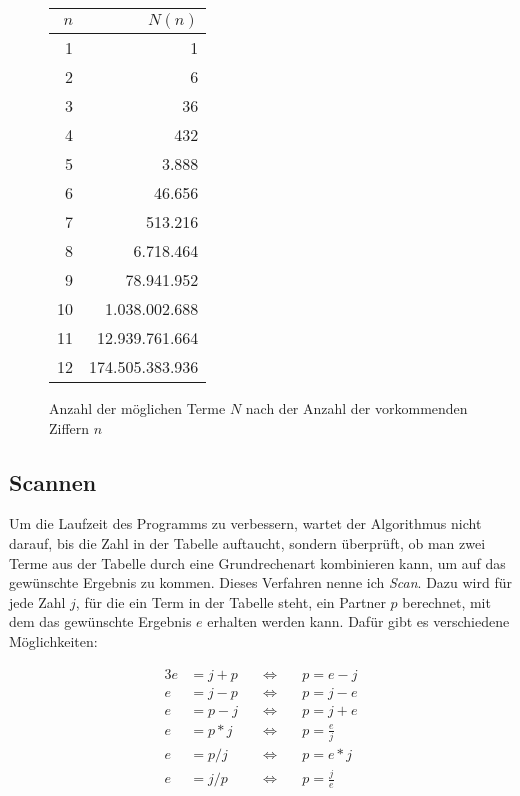 \documentclass[a4paper,10pt,ngerman]{scrartcl}
\begin{document}
\begin{figure}[]
  \centering
  \begin{tabular}{|r|r|}
  $n$ & $N(n)$ \\ \hline
  1 & 1 \\ \hline
  2 & 6 \\ \hline
  3 & 36 \\ \hline
  4 & 432 \\ \hline
  5 & 3.888 \\ \hline
  6 & 46.656 \\ \hline
  7 & 513.216 \\ \hline
  8 & 6.718.464 \\ \hline
  9 & 78.941.952 \\ \hline
  10 & 1.038.002.688 \\ \hline
  11 & 12.939.761.664 \\ \hline
  12 & 174.505.383.936 \\ 
  \end{tabular}
  \caption{Anzahl der möglichen Terme $N$ nach der Anzahl der vorkommenden Ziffern $n$}
  \label{fig:anzahl-terme}
\end{figure}

\subsection{Scannen}
Um die Laufzeit des Programms zu verbessern, wartet der Algorithmus nicht darauf, bis die Zahl in der Tabelle auftaucht, sondern überprüft, ob man zwei Terme aus der Tabelle durch eine Grundrechenart kombinieren kann, um auf das gewünschte Ergebnis zu kommen.
Dieses Verfahren nenne ich \textit{Scan}.
Dazu wird für jede Zahl $j$, für die ein Term in der Tabelle steht, ein Partner $p$ berechnet, mit dem das gewünschte Ergebnis $e$ erhalten werden kann.
Dafür gibt es verschiedene Möglichkeiten:

\begin{alignat*}{3}
  e &= j + p \quad &\Leftrightarrow& \quad p = e - j \\
  e &= j - p \quad &\Leftrightarrow& \quad p = j - e \\
  e &= p - j \quad &\Leftrightarrow& \quad p = j + e \\
  e &= p * j \quad &\Leftrightarrow& \quad p = \frac{e}{j} \\
  e &= p / j \quad &\Leftrightarrow& \quad p = e * j \\
  e &= j / p \quad &\Leftrightarrow& \quad p = \frac{j}{e}
\end{alignat*}
\end{document}
